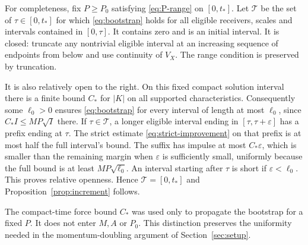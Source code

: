 For completeness, fix $P\ge P_0$ satisfying \eqref{eq:P-range} on
$[0,t_*]$. Let $\mathcal T$ be the set of $\tau\in[0,t_*]$ for
which \eqref{eq:bootstrap} holds for all eligible receivers, scales
and intervals contained in $[0,\tau]$. It contains zero and is an
initial interval. It is closed: truncate any nontrivial eligible
interval at an increasing sequence of endpoints from below and use
continuity of $V_X$. The range condition is preserved by truncation.

It is also relatively open to the right. On this fixed compact
solution interval there is a finite bound $C_*$ for $|K|$ on all
supported characteristics. Consequently some $\ell_0>0$ ensures
\eqref{eq:bootstrap} for every interval of length at most $\ell_0$,
since $C_*I\le MP\sqrt I$ there. If $\tau\in\mathcal T$, a longer
eligible interval ending in $[\tau,\tau+\varepsilon]$ has a prefix
ending at $\tau$. The strict estimate \eqref{eq:strict-improvement}
on that prefix is at most half the full interval's bound. The suffix
has impulse at most $C_*\varepsilon$, which is smaller than the
remaining margin when $\varepsilon$ is sufficiently small, uniformly
because the full bound is at least $MP\sqrt{\ell_0}$. An interval
starting after $\tau$ is short if $\varepsilon<\ell_0$.
This proves relative openness. Hence $\mathcal T=[0,t_*]$ and
Proposition~\ref{prop:increment} follows.

The compact-time force bound $C_*$ was used only to propagate the
bootstrap for a fixed $P$. It does not enter $M,A$ or $P_0$.
This distinction preserves the uniformity needed in the
momentum-doubling argument of Section~\ref{sec:setup}.
